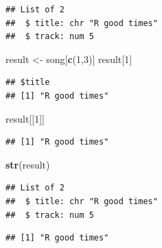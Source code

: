 \documentclass[]{book}
\newenvironment{Shaded}{\begin{snugshade}}{\end{snugshade}}
\newcommand{\KeywordTok}[1]{\textcolor[rgb]{0.13,0.29,0.53}{\textbf{{#1}}}}
\newcommand{\DecValTok}[1]{\textcolor[rgb]{0.00,0.00,0.81}{{#1}}}
\newcommand{\StringTok}[1]{\textcolor[rgb]{0.31,0.60,0.02}{{#1}}}
\newcommand{\NormalTok}[1]{{#1}}
\begin{document}
\begin{verbatim}
## List of 2
##  $ title: chr "R good times"
##  $ track: num 5
\end{verbatim}

\begin{Shaded}
\begin{Highlighting}[]
\NormalTok{result <-}\StringTok{ }\NormalTok{song[}\KeywordTok{c}\NormalTok{(}\DecValTok{1}\NormalTok{,}\DecValTok{3}\NormalTok{)]}
\NormalTok{result[}\DecValTok{1}\NormalTok{]}
\end{Highlighting}
\end{Shaded}

\begin{verbatim}
## $title
## [1] "R good times"
\end{verbatim}

\begin{Shaded}
\begin{Highlighting}[]
\NormalTok{result[[}\DecValTok{1}\NormalTok{]]}
\end{Highlighting}
\end{Shaded}

\begin{verbatim}
## [1] "R good times"
\end{verbatim}

\begin{Shaded}
\begin{Highlighting}[]
\KeywordTok{str}\NormalTok{(result)}
\end{Highlighting}
\end{Shaded}

\begin{verbatim}
## List of 2
##  $ title: chr "R good times"
##  $ track: num 5
\end{verbatim}

\begin{Shaded}
\end{Shaded}

\begin{verbatim}
## [1] "R good times"
\end{verbatim}

\begin{Shaded}
\end{Shaded}
\end{document}
